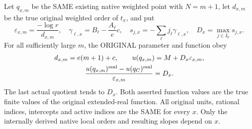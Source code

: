 \begin{theorem}
Let $q_{x,m}$ be the SAME existing native weighted point with $N=m+1$,
let $d_{x,m}$ be the true original weighted order of $t_x$, and put
\[
 \varepsilon_{x,m}=\frac{-\log r}{d_{x,m}},\quad
 \gamma_{\ell,x}=B_\ell-\frac{A_\ell}{e}c,\quad
 s_{j,x}=-\sum_\ell j_\ell\gamma_{\ell,x},\quad
 D_x=\max_{j\in I_0}s_{j,x}.
\]
For all sufficiently large $m$, the ORIGINAL parameter and function obey
\[
 \begin{gathered}
 d_{x,m}=e(m+1)+c,\qquad
 u(q_{x,m})=M+D_x\varepsilon_{x,m},\\
 \frac{u(q_{x,m})^{\rm real}-u(q_C)^{\rm real}}
      {\varepsilon_{x,m}}=D_x.
 \end{gathered}
\]
The last actual quotient tends to $D_x$. Both asserted function values
are the true finite values of the original extended-real function.
All original units, rational indices, intercepts and active indices are
the SAME for every $x$. Only the internally derived native local orders
and resulting slopes depend on $x$.
\end{theorem}
